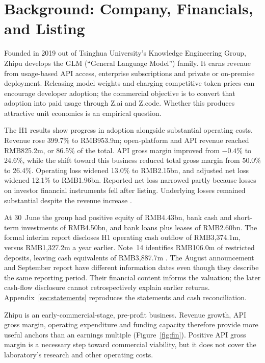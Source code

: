 \documentclass[11pt]{article}
\begin{document}
\section{Background: Company, Financials, and Listing}
\label{sec:bg}
Founded in 2019 out of Tsinghua University's Knowledge Engineering Group, Zhipu develops the GLM (``General Language Model'') family. It earns revenue from usage-based API access, enterprise subscriptions and private or on-premise deployment. Releasing model weights and charging competitive token prices can encourage developer adoption; the commercial objective is to convert that adoption into paid usage through Z.ai and Z.code. Whether this produces attractive unit economics is an empirical question.

The H1 results show progress in adoption alongside substantial operating costs. Revenue rose 399.7\% to RMB953.9m; open-platform and API revenue reached RMB825.2m, or 86.5\% of the total. API gross margin improved from $-0.4\%$ to 24.6\%, while the shift toward this business reduced total gross margin from 50.0\% to 26.4\%. Operating loss widened 13.0\% to RMB2.15bn, and adjusted net loss widened 12.1\% to RMB1.96bn. Reported net loss narrowed partly because losses on investor financial instruments fell after listing. Underlying losses remained substantial despite the revenue increase \citep{interim2026}.

At 30~June the group had positive equity of RMB4.43bn, bank cash and short-term investments of RMB4.50bn, and bank loans plus leases of RMB2.60bn. The formal interim report discloses H1 operating cash outflow of RMB3,374.1m, versus RMB1,327.2m a year earlier. Note~14 identifies RMB106.0m of restricted deposits, leaving cash equivalents of RMB3,887.7m \citep{interimreport2026}. The August announcement and September report have different information dates even though they describe the same reporting period. Their financial content informs the valuation; the later cash-flow disclosure cannot retrospectively explain earlier returns. Appendix~\ref{sec:statements} reproduces the statements and cash reconciliation.

Zhipu is an early-commercial-stage, pre-profit business. Revenue growth, API gross margin, operating expenditure and funding capacity therefore provide more useful anchors than an earnings multiple (Figure~\ref{fig:fin}). Positive API gross margin is a necessary step toward commercial viability, but it does not cover the laboratory's research and other operating costs.
\end{document}
